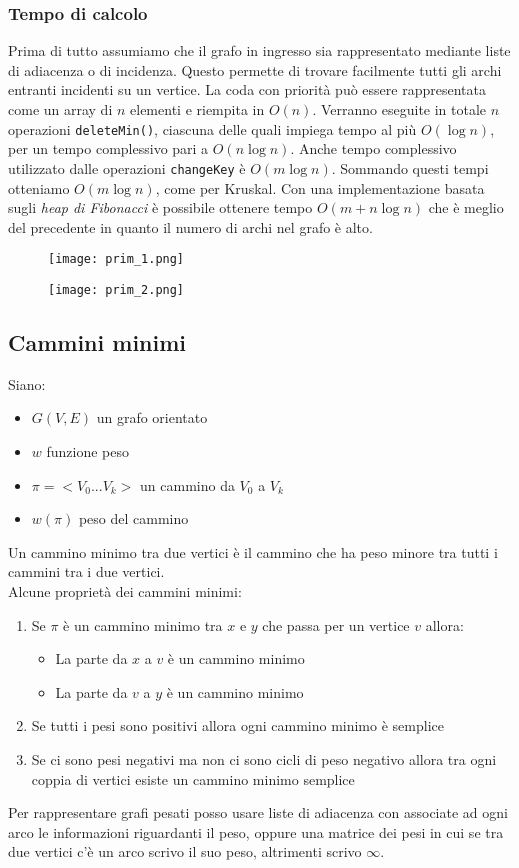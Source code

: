 \subsubsection*{Tempo di calcolo}
Prima di tutto assumiamo che il grafo in ingresso sia rappresentato mediante liste di adiacenza o di incidenza. Questo 
permette di trovare facilmente tutti gli archi entranti incidenti su un vertice. 
La coda con priorità può essere rappresentata come un array di $n$ elementi 
e riempita in $O(n)$. Verranno eseguite in totale $n$ operazioni \texttt{deleteMin()}, ciascuna delle
quali impiega tempo al più $O(\log n)$, per un tempo complessivo pari a $O(n \log n)$.
Anche tempo complessivo utilizzato dalle operazioni \texttt{changeKey} è $O(m \log n)$.
Sommando questi tempi otteniamo $O(m \log n)$, come per Kruskal. Con una implementazione
basata sugli \emph{heap di Fibonacci} è possibile ottenere tempo $O(m + n \log n)$ che è meglio del precedente 
in quanto il numero di archi nel grafo è alto.
\begin{figure}[h]
    \texttt{[image: prim\_1.png]}
\end{figure}
\begin{figure}[h]
    \texttt{[image: prim\_2.png]}
\end{figure}
\clearpage

\subsection{Cammini minimi}
Siano:
\begin{itemize}
    \item $G(V, E)$ un grafo orientato
    \item $w$ funzione peso
    \item $\pi = <V_0...V_k>$ un cammino da $V_0$ a $V_k$
    \item $w(\pi)$ peso del cammino
\end{itemize}

Un cammino minimo tra due vertici è il cammino che ha peso minore tra tutti i cammini tra i due vertici.\\
Alcune proprietà dei cammini minimi:
\begin{enumerate}
    \item Se $\pi$ è un cammino minimo tra $x$ e $y$ che passa per un vertice $v$ allora:
    \begin{itemize}
        \item La parte da $x$ a $v$ è un cammino minimo 
        \item La parte da $v$ a $y$ è un cammino minimo 
    \end{itemize}
    \item Se tutti i pesi sono positivi allora ogni cammino minimo è semplice
    \item Se ci sono pesi negativi ma non ci sono cicli di peso negativo allora 
    tra ogni coppia di vertici esiste un cammino minimo semplice
\end{enumerate}
Per rappresentare grafi pesati posso usare liste di adiacenza con associate ad ogni arco le informazioni riguardanti il peso,
oppure una matrice dei pesi in cui se tra due vertici c'è un arco scrivo il suo peso, altrimenti scrivo $\infty$.
\clearpage
